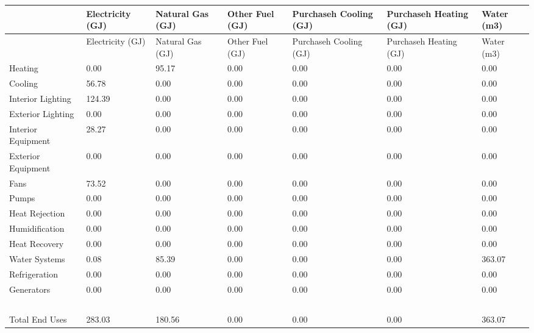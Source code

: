 \begin{longtable}[c]{p{0.85in}p{0.85in}p{0.85in}p{0.85in}p{0.85in}p{0.85in}p{0.85in}}
\toprule 
~ & Electricity (GJ) & Natural Gas (GJ) & Other Fuel (GJ) & Purchaseh Cooling (GJ) & Purchaseh Heating (GJ) & Water (m3) \tabularnewline
\midrule
\endfirsthead

\toprule 
~ & Electricity (GJ) & Natural Gas (GJ) & Other Fuel (GJ) & Purchaseh Cooling (GJ) & Purchaseh Heating (GJ) & Water (m3) \tabularnewline
\midrule
\endhead

Heating & 0.00 & 95.17 & 0.00 & 0.00 & 0.00 & 0.00 \tabularnewline
Cooling & 56.78 & 0.00 & 0.00 & 0.00 & 0.00 & 0.00 \tabularnewline
Interior Lighting & 124.39 & 0.00 & 0.00 & 0.00 & 0.00 & 0.00 \tabularnewline
Exterior Lighting & 0.00 & 0.00 & 0.00 & 0.00 & 0.00 & 0.00 \tabularnewline
Interior Equipment & 28.27 & 0.00 & 0.00 & 0.00 & 0.00 & 0.00 \tabularnewline
Exterior Equipment & 0.00 & 0.00 & 0.00 & 0.00 & 0.00 & 0.00 \tabularnewline
Fans & 73.52 & 0.00 & 0.00 & 0.00 & 0.00 & 0.00 \tabularnewline
Pumps & 0.00 & 0.00 & 0.00 & 0.00 & 0.00 & 0.00 \tabularnewline
Heat Rejection & 0.00 & 0.00 & 0.00 & 0.00 & 0.00 & 0.00 \tabularnewline
Humidification & 0.00 & 0.00 & 0.00 & 0.00 & 0.00 & 0.00 \tabularnewline
Heat Recovery & 0.00 & 0.00 & 0.00 & 0.00 & 0.00 & 0.00 \tabularnewline
Water Systems & 0.08 & 85.39 & 0.00 & 0.00 & 0.00 & 363.07 \tabularnewline
Refrigeration & 0.00 & 0.00 & 0.00 & 0.00 & 0.00 & 0.00 \tabularnewline
Generators & 0.00 & 0.00 & 0.00 & 0.00 & 0.00 & 0.00 \tabularnewline
~ & ~ & ~ & ~ & ~ & ~ & ~ \tabularnewline
Total End Uses & 283.03 & 180.56 & 0.00 & 0.00 & 0.00 & 363.07 \tabularnewline
\bottomrule
\end{longtable}
